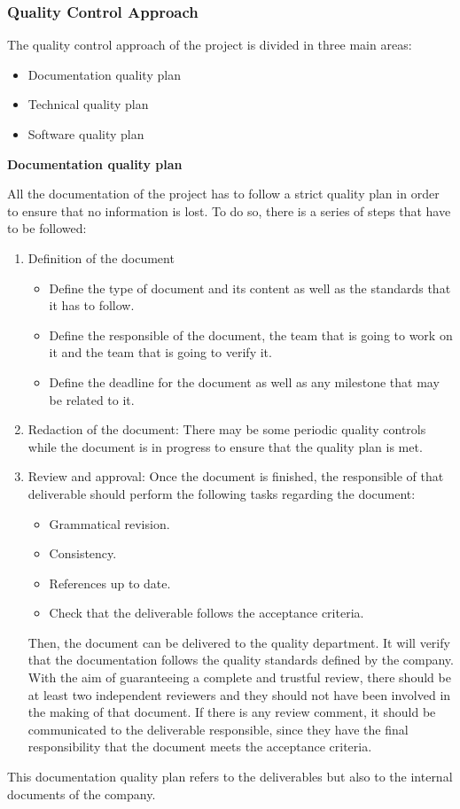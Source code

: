 \subsubsection{Quality Control Approach}

The quality control approach of the project is divided in three main areas:
\begin{itemize}
	\item Documentation quality plan
	\item Technical quality plan
	\item Software quality plan
\end{itemize}

\textbf{Documentation quality plan}

All the documentation of the project has to follow a strict quality plan in order to ensure that no information is lost. To do so, there is a series of steps that have to be followed:
\begin{enumerate}
	\item Definition of the document
	\begin{itemize}
		\item Define the type of document and its content as well as the standards that it has to follow.
		\item Define the responsible of the document, the team that is going to work on it and the team that is going to verify it.
		\item Define the deadline for the document as well as any milestone that may be related to it.
	\end{itemize}
	\item Redaction of the document: There may be some periodic quality controls while the document is in progress to ensure that the quality plan is met.
	\item Review and approval: Once the document is finished, the responsible of that deliverable should perform the following tasks regarding the document:
	\begin{itemize}
		\item Grammatical revision.
		\item Consistency.
		\item References up to date.
		\item Check that the deliverable follows the acceptance criteria.
	\end{itemize}
	Then, the document can be delivered to the quality department. It will verify that the documentation follows the quality standards defined by the company. With the aim of guaranteeing a complete and trustful review, there should be at least two independent reviewers and they should not have been involved in the making of that document.
	If there is any review comment, it should be communicated to the deliverable responsible, since they have the final responsibility that the document meets the acceptance criteria.
\end{enumerate}
This documentation quality plan refers to the deliverables but also to the internal documents of the company.


